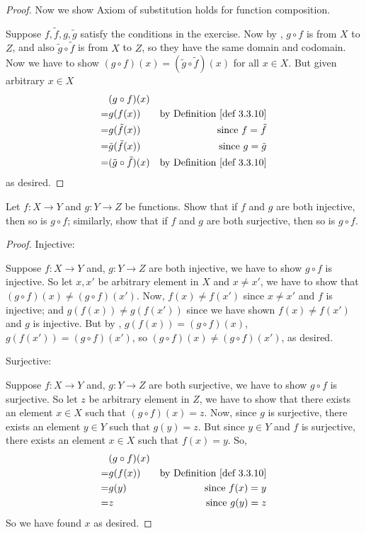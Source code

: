 \begin{proof}
Now we show Axiom of substitution  holds for function composition.

Suppose \(f, \tilde{f}, g, \tilde{g}\) satisfy the conditions in the exercise.
Now by , \(g \circ f\) is from \(X\) to \(Z\), and also \(\tilde{g} \circ \tilde{f}\) is from \(X\) to \(Z\), so they have the same domain and codomain.
Now we have to show \((g \circ f)(x) = (\tilde{g} \circ \tilde{f})(x)\) for all \(x \in X\).
But given arbitrary \(x \in X\)
\begin{align*}
      & (g \circ f)(x) \\
    = & g(f(x)) & \text{by \DEF{3.3.10}} \\
    = & g(\tilde{f}(x)) & \text{since \(f = \tilde{f}\)} \\
    = & \tilde{g}(\tilde{f}(x)) & \text{since \(g = \tilde{g}\)} \\
    = & (\tilde{g} \circ \tilde{f})(x) & \text{by \DEF{3.3.10}}
\end{align*}
as desired.
\end{proof}

\begin{exercise} \label{exercise 3.3.2}
Let \(f : X \rightarrow Y\) and \(g : Y \rightarrow Z\) be functions.
Show that if \(f\) and \(g\) are both injective, then so is \(g \circ f\);
similarly, show that if \(f\) and \(g\) are both surjective, then so is \(g \circ f\).
\end{exercise}

\begin{proof}
Injective:

Suppose \(f : X \rightarrow Y\) and, \(g : Y \rightarrow Z\) are both injective, we have to show \(g \circ f\) is injective.
So let \(x, x'\) be arbitrary element in \(X\) and \(x \neq x'\), we have to show that \((g \circ f)(x) \neq (g \circ f)(x')\).
Now, \(f(x) \neq f(x')\) since \(x \neq x'\) and \(f\) is injective; and \(g(f(x)) \neq g(f(x'))\) since we have shown \(f(x) \neq f(x')\) and \(g\) is injective.
But by , \(g(f(x)) = (g \circ f)(x)\), \(g(f(x')) = (g \circ f)(x')\), so \((g \circ f)(x) \neq (g \circ f)(x')\), as desired.

Surjective:

Suppose \(f : X \rightarrow Y\) and, \(g : Y \rightarrow Z\) are both surjective, we have to show \(g \circ f\) is surjective.
So let \(z\) be arbitrary element in \(Z\), we have to show that there exists an element \(x \in X\) such that \((g \circ f)(x) = z\).
Now, since \(g\) is surjective, there exists an element \(y \in Y\) such that \(g(y) = z\).
But since \(y \in Y\) and \(f\) is surjective, there exists an element \(x \in X\) such that \(f(x) = y\).
So,
\begin{align*}
      & (g \circ f)(x) \\
    = & g(f(x)) & \text{by \DEF{3.3.10}} \\
    = & g(y)    &\text{since \(f(x) = y\)} \\
    = & z       & \text{since \(g(y) = z\)}
\end{align*}
So we have found \(x\) as desired.
\end{proof}

